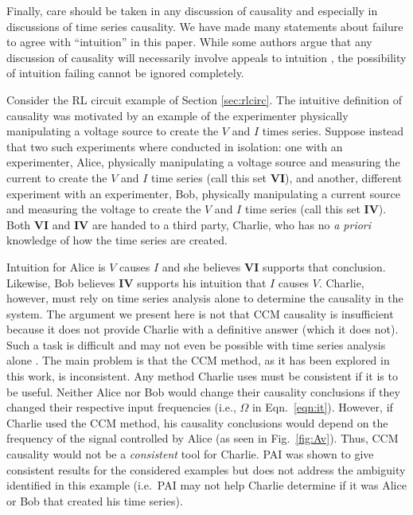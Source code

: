 \documentclass[twocolumn,aps,pre,groupedaddress]{revtex4-1}
\begin{document}
Finally, care should be taken in any discussion of causality and especially in discussions of time series causality.  We have made many statements about failure to agree with ``intuition'' in this paper.  While some authors argue that any discussion of causality will necessarily involve appeals to intuition \cite{Pearl2000}, the possibility of intuition failing cannot be ignored completely.  

Consider the RL circuit example of Section \ref{sec:rlcirc}.  The intuitive definition of causality was motivated by an example of the experimenter physically manipulating a voltage source to create the $V$ and $I$ times series.  Suppose instead that two such experiments where conducted in isolation: one with an experimenter, Alice, physically manipulating a voltage source and measuring the current to create the $V$ and $I$ time series (call this set $\mathbf{VI}$), and another, different experiment with an experimenter, Bob, physically manipulating a current source and measuring the voltage to create the $V$ and $I$ time series (call this set $\mathbf{IV}$).  Both $\mathbf{VI}$ and $\mathbf{IV}$ are handed to a third party, Charlie, who has no {\em a priori} knowledge of how the time series are created.

Intuition for Alice is $V$ causes $I$ and she believes $\mathbf{VI}$ supports that conclusion.  Likewise, Bob believes $\mathbf{IV}$ supports his intuition that $I$ causes $V$.  Charlie, however, must rely on time series analysis alone to determine the causality in the system.  The argument we present here is not that CCM causality is insufficient because it does not provide Charlie with a definitive answer (which it does not).  Such a task is difficult and may not even be possible with time series analysis alone \cite{Pearl2000}.  The main problem is that the CCM method, as it has been explored in this work, is inconsistent.  Any method Charlie uses must be consistent if it is to be useful.  Neither Alice nor Bob would change their causality conclusions if they changed their respective input frequencies (i.e., $\Omega$ in Eqn.\ \ref{eqn:it}).  However, if Charlie used the CCM method, his causality conclusions would depend on the frequency of the signal controlled by Alice (as seen in Fig.\ \ref{fig:Av}).  Thus, CCM causality would not be a {\em consistent} tool for Charlie.  PAI was shown to give consistent results for the considered examples but does not address the ambiguity identified in this example (i.e.\ PAI may not help Charlie determine if it was Alice or Bob that created his time series).
\end{document}
